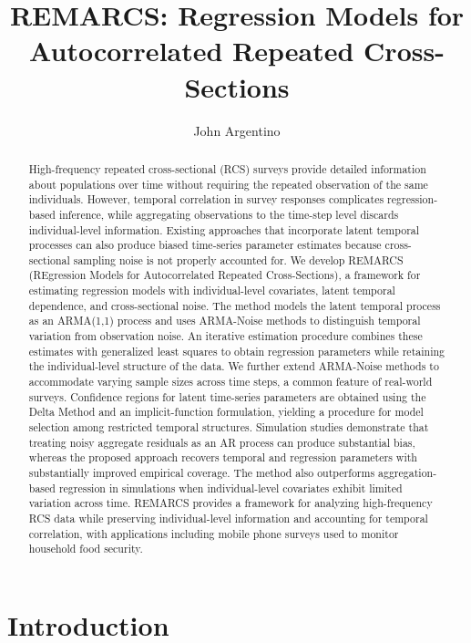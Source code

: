 \documentclass{article}
\author{John Argentino}
\title{REMARCS: Regression Models for Autocorrelated Repeated Cross-Sections}
\numberwithin{equation}{section}
\theoremstyle{plain}
\begin{document}
\maketitle
\begin{abstract}
    High-frequency repeated cross-sectional (RCS) surveys provide detailed information about populations over time without requiring the repeated observation of the same individuals. However, temporal correlation in survey responses complicates regression-based inference, while aggregating observations to the time-step level discards individual-level information. Existing approaches that incorporate latent temporal processes can also produce biased time-series parameter estimates because cross-sectional sampling noise is not properly accounted for. We develop REMARCS (REgression Models for Autocorrelated Repeated Cross-Sections), a framework for estimating regression models with individual-level covariates, latent temporal dependence, and cross-sectional noise. The method models the latent temporal process as an ARMA(1,1) process and uses ARMA-Noise methods to distinguish temporal variation from observation noise. An iterative estimation procedure combines these estimates with generalized least squares to obtain regression parameters while retaining the individual-level structure of the data. We further extend ARMA-Noise methods to accommodate varying sample sizes across time steps, a common feature of real-world surveys. Confidence regions for latent time-series parameters are obtained using the Delta Method and an implicit-function formulation, yielding a procedure for model selection among restricted temporal structures. Simulation studies demonstrate that treating noisy aggregate residuals as an AR process can produce substantial bias, whereas the proposed approach recovers temporal and regression parameters with substantially improved empirical coverage. The method also outperforms aggregation-based regression in simulations when individual-level covariates exhibit limited variation across time. REMARCS provides a framework for analyzing high-frequency RCS data while preserving individual-level information and accounting for temporal correlation, with applications including mobile phone surveys used to monitor household food security.
\end{abstract}
\pagestyle{plain}
\setcounter{page}{2}



\noindent
\section{Introduction}

\end{document}
